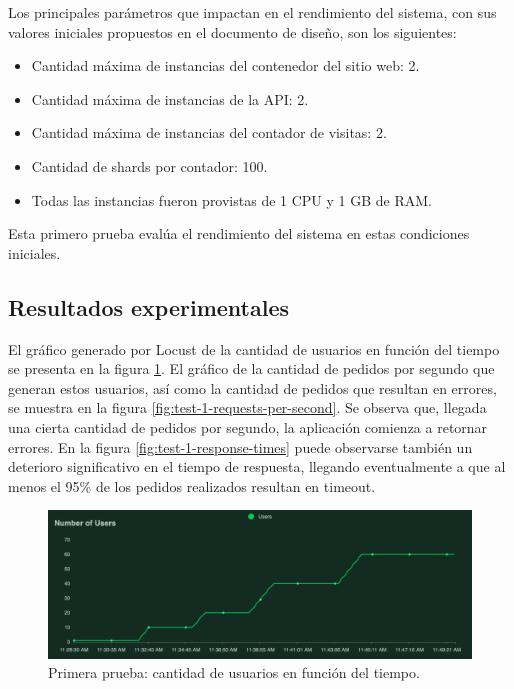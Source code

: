 \documentclass[11pt]{scrartcl}
\begin{document}
Los principales parámetros que impactan en el rendimiento del sistema, con sus valores iniciales propuestos en el documento de diseño, son los siguientes:
\begin{itemize}
\item Cantidad máxima de instancias del contenedor del sitio web: 2.
\item Cantidad máxima de instancias de la API: 2.
\item Cantidad máxima de instancias del contador de visitas: 2.
\item Cantidad de shards por contador: 100.
\item Todas las instancias fueron provistas de 1 CPU y 1 GB de RAM.
\end{itemize}
Esta primero prueba evalúa el rendimiento del sistema en estas condiciones iniciales.

\subsection{Resultados experimentales}\label{sec:results-1}

El gráfico generado por Locust de la cantidad de usuarios en función del tiempo se presenta en la figura \ref{fig:test-1-users}. El gráfico de la cantidad de pedidos por segundo que generan estos usuarios, así como la cantidad de pedidos que resultan en errores, se muestra en la figura \ref{fig:test-1-requests-per-second}. Se observa que, llegada una cierta cantidad de pedidos por segundo, la aplicación comienza a retornar errores. En la figura \ref{fig:test-1-response-times} puede observarse también un deterioro significativo en el tiempo de respuesta, llegando eventualmente a que al menos el 95\% de los pedidos realizados resultan en timeout.

\begin{figure}
\centering
\includegraphics[scale=0.44]{img/usercount}
\caption{Primera prueba: cantidad de usuarios en función del tiempo.}
\label{fig:test-1-users}
\end{figure}
\end{document}
